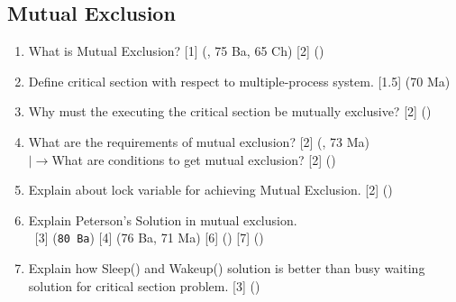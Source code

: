 \documentclass[12pt]{article}
\newcommand{\lb}{\\$\left|\rightarrow\right.$}
\newcommand{\enter}{\\\textcolor{white}{1}}
\begin{document}
	\subsection{Mutual Exclusion}
		\begin{enumerate}[noitemsep, topsep=0pt]
			\item What is Mutual Exclusion? \hfill [1] (, 75 Ba, 65 Ch) [2] ()
			
			\item Define critical section with respect to multiple-process system. \hfill [1.5] (70 Ma)
			
			\item Why must the executing the critical section be mutually exclusive? \hfill [2] ()
			
			\item What are the requirements of mutual exclusion? \hfill [2] (, 73 Ma)
			\lb What are conditions to get mutual exclusion? \hfill [2] ()
			
			\item Explain about lock variable for achieving Mutual Exclusion. \hfill [2] ()
			
			\item Explain Peterson's Solution in mutual exclusion.
			\enter\hfill [3] (\texttt{80 Ba}) [4] (76 Ba, 71 Ma) [6] () [7] ()
			
			\item Explain how Sleep() and Wakeup() solution is better than busy waiting solution for critical section problem. \hfill [3] ()
		\end{enumerate}
		
\end{document}

